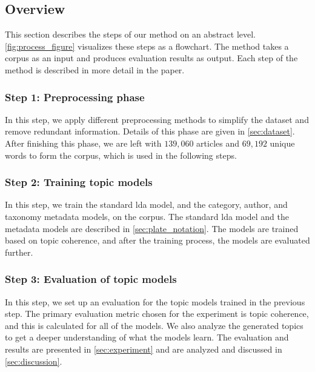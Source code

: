 \subsection{Overview}\label{sec:overview}
This section describes the steps of our method on an abstract level.
\autoref{fig:process_figure} visualizes these steps as a flowchart.
The method takes a corpus as an input and produces evaluation results as output.
Each step of the method is described in more detail in the paper.

\subsubsection*{Step 1: Preprocessing phase}
In this step, we apply different preprocessing methods to simplify the dataset and remove redundant information.
Details of this phase are given in \autoref{sec:dataset}.
After finishing this phase, we are left with $139,060$ articles and $69,192$ unique words to form the corpus, which is used in the following steps.

\subsubsection*{Step 2: Training topic models}
In this step, we train the standard \gls{lda} model, and the category, author, and taxonomy metadata models, on the corpus.
The standard \gls{lda} model and the metadata models are described in \autoref{sec:plate_notation}.
The models are trained based on topic coherence, and after the training process, the models are evaluated further.

\subsubsection*{Step 3: Evaluation of topic models}
In this step, we set up an evaluation for the topic models trained in the previous step.
The primary evaluation metric chosen for the experiment is topic coherence, and this is calculated for all of the models.
We also analyze the generated topics to get a deeper understanding of what the models learn.
The evaluation and results are presented in \autoref{sec:experiment} and are analyzed and discussed in \autoref{sec:discussion}.


